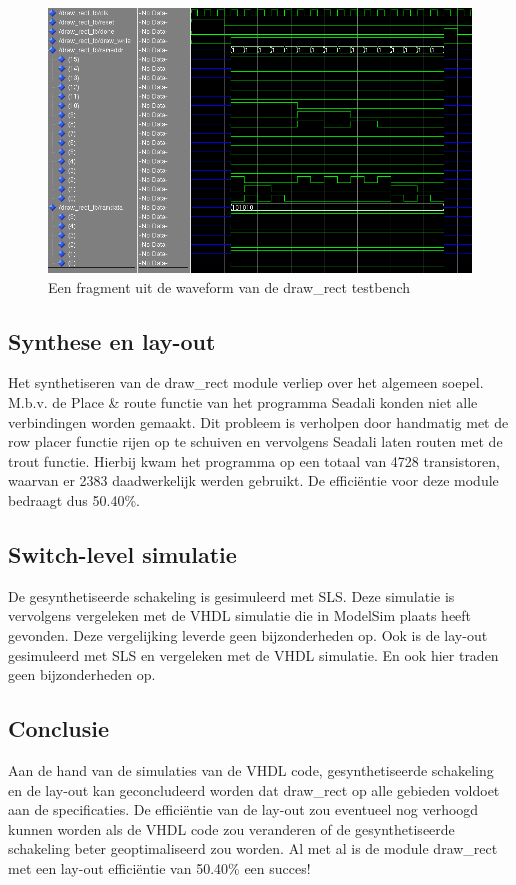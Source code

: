 \documentclass{scrartcl} %
\begin{document}
\begin{figure}[H]
	\centering
	\includegraphics[width=\textwidth]{resources/draw_rect-vhdlsim.png}
	\caption{Een fragment uit de waveform van de draw\_rect testbench}
	\label{fig:draw_rect-vhdlsim}
\end{figure}

\subsection{Synthese en lay-out}
Het synthetiseren van de draw\_rect module verliep over het algemeen soepel. M.b.v. de Place \& route functie van het programma Seadali konden niet alle verbindingen worden gemaakt. Dit probleem is verholpen door handmatig met de row placer functie rijen op te schuiven en vervolgens Seadali laten routen met de trout functie. Hierbij kwam het programma op een totaal van 4728 transistoren, waarvan er 2383 daadwerkelijk werden gebruikt. De efficiëntie voor deze module bedraagt dus 50.40\%.

\subsection{Switch-level simulatie}
De gesynthetiseerde schakeling is gesimuleerd met SLS. Deze simulatie is vervolgens vergeleken met de VHDL simulatie die in ModelSim plaats heeft gevonden. Deze vergelijking leverde geen bijzonderheden op. Ook is de lay-out gesimuleerd met SLS en vergeleken met de VHDL simulatie. En ook hier traden geen bijzonderheden op.

\subsection{Conclusie}
Aan de hand van de simulaties van de VHDL code, gesynthetiseerde schakeling en de lay-out kan geconcludeerd worden dat draw\_rect op alle gebieden voldoet aan de specificaties. De efficiëntie van de lay-out zou eventueel nog verhoogd kunnen worden als de VHDL code zou veranderen of de gesynthetiseerde schakeling beter geoptimaliseerd zou worden. Al met al is de module draw\_rect met een lay-out efficiëntie van 50.40\% een succes!
\end{document}
